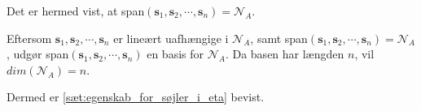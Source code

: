 \begin{bev}
\begin{itemize}
Det er hermed vist, at span$(\textbf{s}_1, \textbf{s}_2,\cdots, \textbf{s}_n) = \mathcal{N}_A$.

Eftersom $\textbf{s}_1, \textbf{s}_2, \cdots, \textbf{s}_n$ er lineært uafhængige i $\mathcal{N}_A$, samt span$(\textbf{s}_1, \textbf{s}_2,\cdots, \textbf{s}_n) = \mathcal{N}_A$, udgør span$(\textbf{s}_1, \textbf{s}_2,\cdots, \textbf{s}_n)$ en basis for $\mathcal{N}_A$. Da basen har længden $n$, vil $dim (\mathcal{N}_A) = n$. 
\end{itemize}
Dermed er \autoref{sæt:egenskab_for_søjler_i_eta} bevist.
\end{bev}
